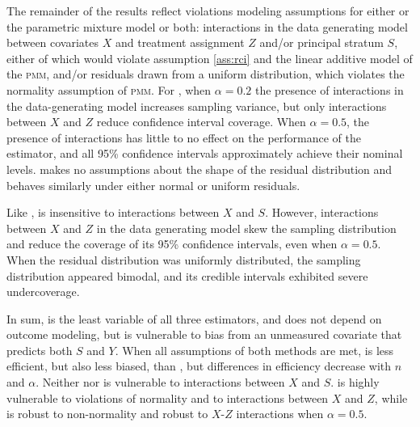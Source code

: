 \documentclass[]{article}
\begin{document}
The remainder of the results reflect violations modeling assumptions for either \geepers or the parametric mixture model or both: interactions in the data generating model between covariates $X$ and treatment assignment $Z$ and/or principal stratum $S$, either of which would violate assumption \ref{ass:rci} and the linear additive model of the \textsc{pmm}, and/or residuals drawn from a uniform distribution, which violates the normality assumption of \textsc{pmm}.
For \geepers, when $\alpha=0.2$ the presence of interactions in the data-generating model increases sampling variance, but only interactions between $X$ and $Z$ reduce confidence interval coverage. When $\alpha=0.5$, the presence of interactions has little to no effect on the performance of the \geepers estimator, and all 95\% confidence intervals approximately achieve their nominal levels. \geepers makes no assumptions about the shape of the residual distribution and behaves similarly under either normal or uniform residuals.

Like \geepers, \pmm is insensitive to interactions between $X$ and $S$. However, interactions between $X$ and $Z$ in the data generating model skew the \pmm sampling distribution and reduce the coverage of its 95\% confidence intervals, even when $\alpha=0.5$.
When the residual distribution was uniformly distributed, the \pmm sampling distribution appeared bimodal, and its credible intervals exhibited severe undercoverage.

\label{simsum}In sum, \psw is the least variable of all three estimators, and does not depend on outcome modeling, but is vulnerable to bias from an unmeasured covariate that predicts both $S$ and $Y$.
When all assumptions of both methods are met, \geepers is less efficient, but also less biased, than \pmm, but differences in efficiency decrease with $n$ and $\alpha$.
Neither \psw nor \pmm is vulnerable to interactions between $X$ and $S$.
\pmm is highly vulnerable to violations of normality and to interactions between $X$ and $Z$, while \psw is robust to non-normality and robust to $X$-$Z$ interactions when $\alpha = 0.5$.
\end{document}
